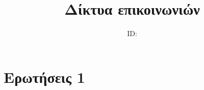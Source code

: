 \documentclass{article}
\title{Δίκτυα επικοινωνιών \\ \exerciseset}
\author{\studentname \qquad  ID: \suid}
\begin{document}
\maketitle
\begin{figure}[ht!]
	\centering
	\qquad
	
\end{figure}

\section*{Ερωτήσεις 1}
\end{document}
